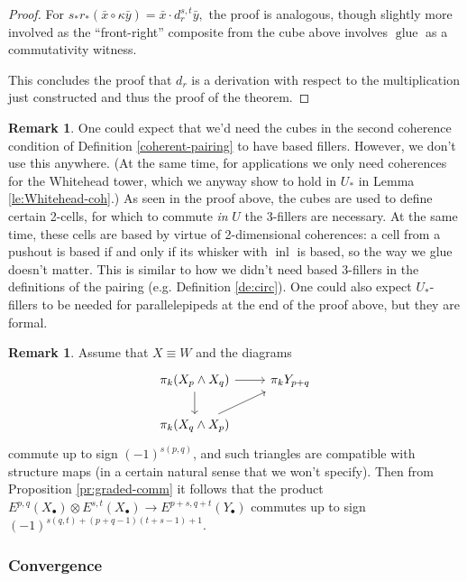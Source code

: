 \documentclass{amsart}
\theoremstyle{definition}
\newtheorem{re}[theorem]{Remark}
\newcommand{\inl}{\operatorname{inl}}
\newcommand{\glue}{\operatorname{glue}}
\begin{document}
\begin{proof}
For $s_* r_* (\bar{x} \circ \kappa \bar{y}) = \bar{x} \cdot d_r^{s,t}\bar{y},$ the proof is analogous, though slightly more involved as the ``front-right'' composite from the cube above involves $\glue$ as a commutativity witness.

This concludes the proof that $d_r$ is a derivation with respect to the multiplication just constructed and thus the proof of the theorem.
\end{proof}

\begin{re}
    One could expect that we'd need the cubes in the second coherence condition of Definition \ref{coherent-pairing} to have based fillers. However, we don't use this anywhere. (At the same time, for applications we only need coherences for the Whitehead tower, which we anyway show to hold in $U_*$ in Lemma \ref{le:Whitehead-coh}.)
    As seen in the proof above, the cubes are used to define certain 2-cells, for which to commute \textit{in} $U$ the 3-fillers are necessary. At the same time, these cells are based by virtue of 2-dimensional coherences: a cell from a pushout is based if and only if its whisker with $\inl$ is based, so the way we glue doesn't matter. This is similar to how we didn't need based 3-fillers in the definitions of the pairing (e.g. Definition \ref{de:circ}).  One could also expect $U_*$-fillers to be needed for parallelepipeds at the end of the proof above, but they are formal.
\end{re}

\begin{re}\label{re:graded-comm-SS}
    Assume that $X \equiv W$ and the diagrams
    \[\begin{tikzcd}
    	{\pi_k (X_p \wedge X_q)} & {\pi_k Y_{p+q}} \\
    	{\pi_k (X_q \wedge X_p)}
    	\arrow[from=1-1, to=1-2]
    	\arrow[from=1-1, to=2-1]
    	\arrow[from=2-1, to=1-2]
    \end{tikzcd}\]
    commute up to sign $(-1)^{s(p,q)}$, and such triangles are compatible with structure maps (in a certain natural sense that we won't specify). Then from Proposition \ref{pr:graded-comm} it follows that the product $E^{p,q}(X_\bullet) \otimes E^{s,t}(X_\bullet) \to E^{p+s,q+t}(Y_\bullet)$ commutes up to sign $(-1)^{s(q,t) + (p+q-1)(t+s-1)+1}$.
\end{re}

\subsubsection{Convergence}\label{conv}
\end{document}
